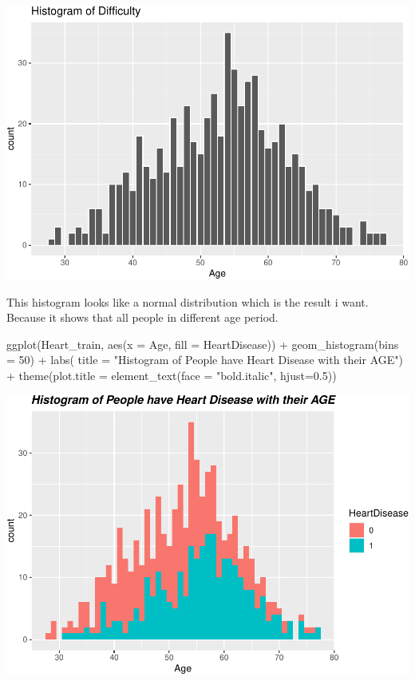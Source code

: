 \documentclass[
]{article}
\newenvironment{Shaded}{\begin{snugshade}}{\end{snugshade}}
\newcommand{\AttributeTok}[1]{\textcolor[rgb]{0.77,0.63,0.00}{#1}}
\newcommand{\DecValTok}[1]{\textcolor[rgb]{0.00,0.00,0.81}{#1}}
\newcommand{\FloatTok}[1]{\textcolor[rgb]{0.00,0.00,0.81}{#1}}
\newcommand{\FunctionTok}[1]{\textcolor[rgb]{0.00,0.00,0.00}{#1}}
\newcommand{\NormalTok}[1]{#1}
\newcommand{\SpecialCharTok}[1]{\textcolor[rgb]{0.00,0.00,0.00}{#1}}
\newcommand{\StringTok}[1]{\textcolor[rgb]{0.31,0.60,0.02}{#1}}
\begin{document}
\includegraphics{PSTAT-131--FINAL-PROJECT-_YIFAN-XU_files/figure-latex/unnamed-chunk-6-1.pdf}

This histogram looks like a normal distribution which is the result i
want. Because it shows that all people in different age period.

\begin{Shaded}
\begin{Highlighting}[]
\FunctionTok{ggplot}\NormalTok{(Heart\_train, }\FunctionTok{aes}\NormalTok{(}\AttributeTok{x =}\NormalTok{ Age, }\AttributeTok{fill =}\NormalTok{ HeartDisease)) }\SpecialCharTok{+}
  \FunctionTok{geom\_histogram}\NormalTok{(}\AttributeTok{bins =} \DecValTok{50}\NormalTok{) }\SpecialCharTok{+}
  \FunctionTok{labs}\NormalTok{(}
    \AttributeTok{title =} \StringTok{"Histogram of People have Heart Disease with their AGE"}\NormalTok{) }\SpecialCharTok{+}
    \FunctionTok{theme}\NormalTok{(}\AttributeTok{plot.title =} \FunctionTok{element\_text}\NormalTok{(}\AttributeTok{face =} \StringTok{"bold.italic"}\NormalTok{, }\AttributeTok{hjust=}\FloatTok{0.5}\NormalTok{))}
\end{Highlighting}
\end{Shaded}

\includegraphics{PSTAT-131--FINAL-PROJECT-_YIFAN-XU_files/figure-latex/unnamed-chunk-7-1.pdf}
\end{document}
